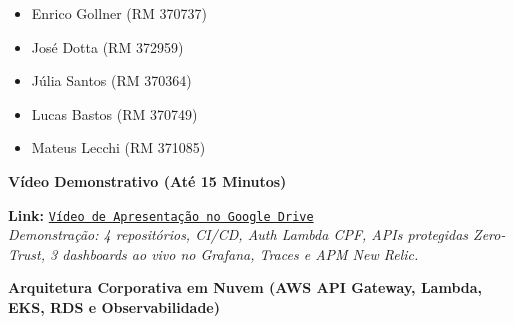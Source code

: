 \documentclass[9pt,a4paper]{article}
\begin{document}
\begin{tcolorbox}[cardbox]
\begin{minipage}[t]{0.43\textwidth}
\begin{itemize}
            \item Enrico Gollner (RM 370737)
            \item José Dotta (RM 372959)
            \item Júlia Santos (RM 370364)
            \item Lucas Bastos (RM 370749)
            \item Mateus Lecchi (RM 371085)
        \end{itemize}
        \vspace{0.15cm}
        \textbf{\color{accentblue} Vídeo Demonstrativo (Até 15 Minutos)}\par\vspace{0.05cm}
        \footnotesize \textbf{Link:} \href{https://drive.google.com/file/d/1wpeMYPY7q6-YYxHCgSaO52PLPLOrK1k3/view?usp=sharing}{\texttt{Vídeo de Apresentação no Google Drive}} \\
        \textit{\scriptsize Demonstração: 4 repositórios, CI/CD, Auth Lambda CPF, APIs protegidas Zero-Trust, 3 dashboards ao vivo no Grafana, Traces e APM New Relic.}
    \end{minipage}
\end{tcolorbox}

\vspace{0.1cm}

\begin{center}
    \textbf{\footnotesize \color{primary} Arquitetura Corporativa em Nuvem (AWS API Gateway, Lambda, EKS, RDS e Observabilidade)}
\end{center}
\vspace{-0.1cm}
\end{document}
